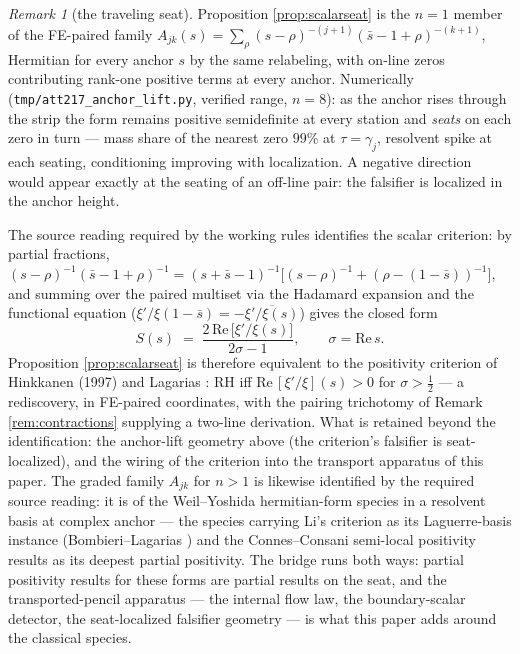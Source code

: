 \documentclass[11pt]{article}
\theoremstyle{plain}
\theoremstyle{definition}
\theoremstyle{remark}
\newtheorem{remark}[theorem]{Remark}
\begin{document}
\begin{remark}[the traveling seat]\label{rem:travelingseat}
Proposition \ref{prop:scalarseat} is the $n=1$ member of the FE-paired family
$A_{jk}(s)=\sum_\rho(s-\rho)^{-(j+1)}(\bar s-1+\rho)^{-(k+1)}$, Hermitian for every
anchor $s$ by the same relabeling, with on-line zeros contributing rank-one positive
terms at every anchor. Numerically (\texttt{tmp/att217\_anchor\_lift.py}, verified
range, $n=8$): as the anchor rises through the strip the form remains positive
semidefinite at every station and \emph{seats} on each zero in turn --- mass share of
the nearest zero $99\%$ at $\tau=\gamma_j$, resolvent spike at each seating,
conditioning improving with localization. A negative direction would appear exactly
at the seating of an off-line pair: the falsifier is localized in the anchor height.

The source reading required by the working rules identifies the scalar criterion: by
partial fractions, $(s-\rho)^{-1}(\bar s-1+\rho)^{-1}
=(s+\bar s-1)^{-1}\bigl[(s-\rho)^{-1}+(\rho-(1-\bar s))^{-1}\bigr]$, and summing over
the paired multiset via the Hadamard expansion and the functional equation
($\xi'/\xi(1-\bar s)=-\overline{\xi'/\xi(s)}$) gives the closed form
\[
  S(s)\;=\;\frac{2\,\mathrm{Re}\,\bigl[\xi'/\xi(s)\bigr]}{2\sigma-1},
  \qquad \sigma=\mathrm{Re}\,s .
\]
Proposition \ref{prop:scalarseat} is therefore equivalent to the positivity
criterion of Hinkkanen (1997) and Lagarias \cite{Lagarias1999}: RH iff
$\mathrm{Re}\,[\xi'/\xi](s)>0$ for $\sigma>\tfrac12$ --- a rediscovery, in
FE-paired coordinates, with the pairing trichotomy of Remark \ref{rem:contractions}
supplying a two-line derivation. What is retained beyond the identification: the
anchor-lift geometry above (the criterion's falsifier is seat-localized), and the
wiring of the criterion into the transport apparatus of this paper. The graded
family $A_{jk}$ for $n>1$ is likewise identified by the required source reading: it
is of the Weil--Yoshida hermitian-form species \cite{Yoshida1992,Bombieri2000} in a
resolvent basis at complex anchor --- the species carrying Li's criterion as its
Laguerre-basis instance (Bombieri--Lagarias \cite{BombieriLagarias1999}) and the
Connes--Consani semi-local positivity results as its deepest partial positivity.
The bridge runs both ways: partial positivity results for these forms are partial
results on the seat, and the transported-pencil apparatus --- the internal flow law,
the boundary-scalar detector, the seat-localized falsifier geometry --- is what this
paper adds around the classical species.
\end{remark}
\end{document}
